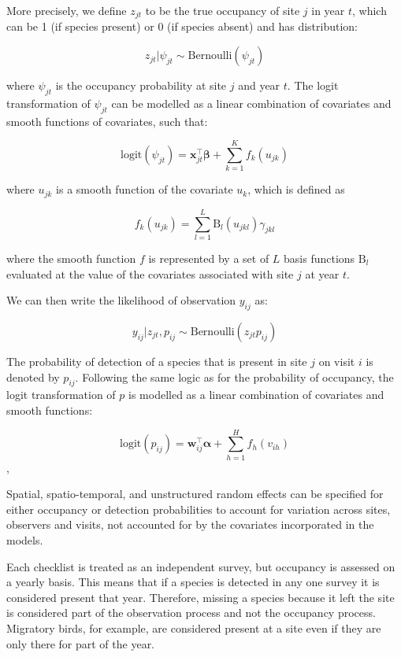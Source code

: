 \documentclass[utf8]{frontiersSCNS}
\begin{document}
More precisely, we define \(z_{jt}\) to be the true occupancy of site
\(j\) in year \(t\), which can be 1 (if species present) or 0 (if
species absent) and has distribution:

\[z_{jt}|\psi_{jt} \sim \textrm{Bernoulli}(\psi_{jt})\]

where \(\psi_{jt}\) is the occupancy probability at site \(j\) and year
\(t\). The logit transformation of \(\psi_{jt}\) can be modelled as a
linear combination of covariates and smooth functions of covariates,
such that:

\[\textrm{logit}(\psi_{jt}) = \boldsymbol{x}_{jt}^\intercal \boldsymbol{\beta} + \sum_{k=1}^K f_k(u_{jk})\]

where \(u_{jk}\) is a smooth function of the covariate \(u_k\), which is
defined as

\[f_k(u_{jk}) = \sum_{l=1}^L \textrm{B}_l(u_{jkl})\gamma_{jkl}\]

where the smooth function \(f\) is represented by a set of \(L\) basis
functions \(\textrm{B}_l\) evaluated at the value of the covariates
associated with site \(j\) at year \(t\).

We can then write the likelihood of observation \(y_{ij}\) as:

\[y_{ij}|z_{jt},p_{ij} \sim \textrm{Bernoulli}(z_{jt}p_{ij})\]

The probability of detection of a species that is present in site \(j\)
on visit \(i\) is denoted by \(p_{ij}\). Following the same logic as for
the probability of occupancy, the logit transformation of \(p\) is
modelled as a linear combination of covariates and smooth functions:

\[\textrm{logit}(p_{ij})= \boldsymbol{w}_{ij}^\intercal \boldsymbol{\alpha} + \sum_{h=1}^H f_h(v_{ih})\],

Spatial, spatio-temporal, and unstructured random effects can be
specified for either occupancy or detection probabilities to account for
variation across sites, observers and visits, not accounted for by the
covariates incorporated in the models.

Each checklist is treated as an independent survey, but occupancy is
assessed on a yearly basis. This means that if a species is detected in
any one survey it is considered present that year. Therefore, missing a
species because it left the site is considered part of the observation
process and not the occupancy process. Migratory birds, for example, are
considered present at a site even if they are only there for part of the
year.
\end{document}
